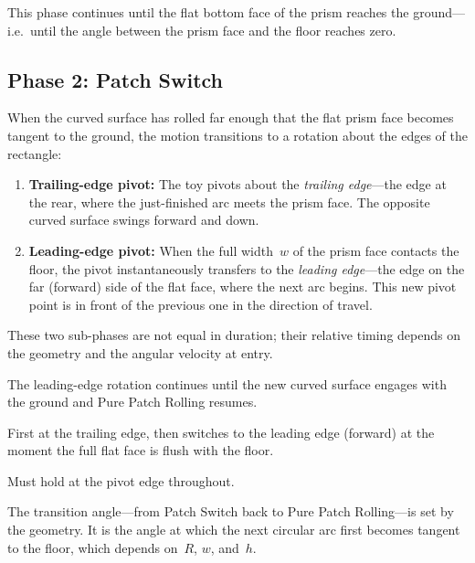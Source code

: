 \documentclass[11pt,a4paper]{article}
\begin{document}
This phase continues until the flat bottom face of the prism reaches the ground---i.e.\
until the angle between the prism face and the floor reaches zero.

\subsection{Phase 2: Patch Switch}

When the curved surface has rolled far enough that the flat prism face becomes tangent
to the ground, the motion transitions to a rotation about the edges of the rectangle:

\begin{enumerate}[nosep]
  \item \textbf{Trailing-edge pivot:} The toy pivots about the \emph{trailing edge}---the edge at
        the rear, where the just-finished arc meets the prism face.  The opposite curved
        surface swings forward and down.
  \item \textbf{Leading-edge pivot:} When the full width~$w$ of the prism face contacts the
        floor, the pivot instantaneously transfers to the \emph{leading edge}---the edge
        on the far (forward) side of the flat face, where the next arc begins.  This new
        pivot point is in front of the previous one in the direction of travel.
\end{enumerate}

These two sub-phases are not equal in duration; their relative timing depends on the
geometry and the angular velocity at entry.

The leading-edge rotation continues until the new curved surface engages with the ground
and Pure Patch Rolling resumes.

\begin{description}[style=nextline, leftmargin=1.5cm]
  \item[Instantaneous axis of rotation]
    First at the trailing edge, then switches to the leading edge (forward) at the moment
    the full flat face is flush with the floor.
  \item[No-slip condition]
    Must hold at the pivot edge throughout.
  \item[Critical angle]
    The transition angle---from Patch Switch back to Pure Patch Rolling---is set by the
    geometry.  It is the angle at which the next circular arc first becomes tangent to the
    floor, which depends on~$R$, $w$, and~$h$.
\end{description}
\end{document}
